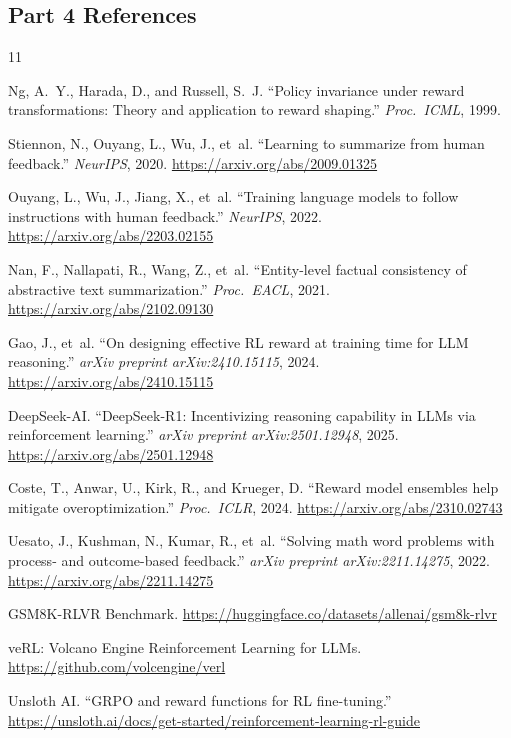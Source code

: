     \subsection{Part 4 References}
    \nestindent
    \renewcommand{\refname}{}
    \vspace{-2em}
    \begin{thebibliography}{11}

        Ng, A.~Y., Harada, D., and Russell, S.~J.
        ``Policy invariance under reward transformations: Theory and application to reward shaping.''
        \textit{Proc.\ ICML}, 1999.

        Stiennon, N., Ouyang, L., Wu, J., et~al.
        ``Learning to summarize from human feedback.''
        \textit{NeurIPS}, 2020.
        \url{https://arxiv.org/abs/2009.01325}

        Ouyang, L., Wu, J., Jiang, X., et~al.
        ``Training language models to follow instructions with human feedback.''
        \textit{NeurIPS}, 2022.
        \url{https://arxiv.org/abs/2203.02155}

        Nan, F., Nallapati, R., Wang, Z., et~al.
        ``Entity-level factual consistency of abstractive text summarization.''
        \textit{Proc.\ EACL}, 2021.
        \url{https://arxiv.org/abs/2102.09130}

        Gao, J., et~al.
        ``On designing effective RL reward at training time for LLM reasoning.''
        \textit{arXiv preprint arXiv:2410.15115}, 2024.
        \url{https://arxiv.org/abs/2410.15115}

        DeepSeek-AI.
        ``DeepSeek-R1: Incentivizing reasoning capability in LLMs via reinforcement learning.''
        \textit{arXiv preprint arXiv:2501.12948}, 2025.
        \url{https://arxiv.org/abs/2501.12948}

        Coste, T., Anwar, U., Kirk, R., and Krueger, D.
        ``Reward model ensembles help mitigate overoptimization.''
        \textit{Proc.\ ICLR}, 2024.
        \url{https://arxiv.org/abs/2310.02743}

        Uesato, J., Kushman, N., Kumar, R., et~al.
        ``Solving math word problems with process- and outcome-based feedback.''
        \textit{arXiv preprint arXiv:2211.14275}, 2022.
        \url{https://arxiv.org/abs/2211.14275}

        GSM8K-RLVR Benchmark.
        \url{https://huggingface.co/datasets/allenai/gsm8k-rlvr}

        veRL: Volcano Engine Reinforcement Learning for LLMs.
        \url{https://github.com/volcengine/verl}

        Unsloth AI.
        ``GRPO and reward functions for RL fine-tuning.''
        \url{https://unsloth.ai/docs/get-started/reinforcement-learning-rl-guide}

    \end{thebibliography}
    \nestunindent

    \newpage
    

\nestunindent
